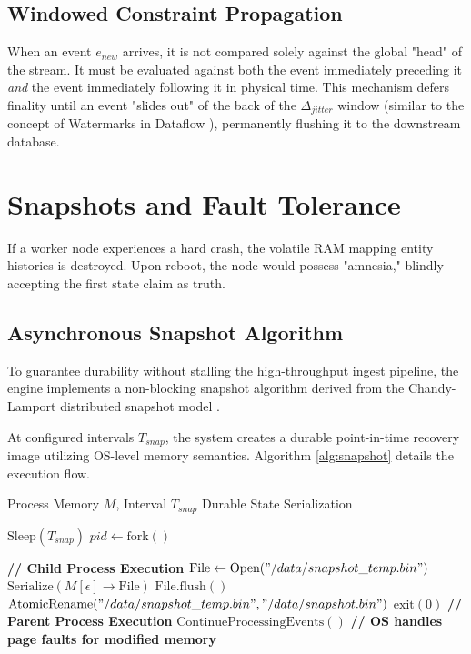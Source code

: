 \documentclass[conference]{IEEEtran}
\begin{document}
\subsection{Windowed Constraint Propagation}
When an event $e_{new}$ arrives, it is not compared solely against the global "head" of the stream. It must be evaluated against both the event immediately preceding it \textit{and} the event immediately following it in physical time. This mechanism defers finality until an event "slides out" of the back of the $\Delta_{jitter}$ window (similar to the concept of Watermarks in Dataflow \cite{b17}), permanently flushing it to the downstream database.

\section{Snapshots and Fault Tolerance}

If a worker node experiences a hard crash, the volatile RAM mapping entity histories is destroyed. Upon reboot, the node would possess "amnesia," blindly accepting the first state claim as truth.

\subsection{Asynchronous Snapshot Algorithm}
To guarantee durability without stalling the high-throughput ingest pipeline, the engine implements a non-blocking snapshot algorithm derived from the Chandy-Lamport distributed snapshot model \cite{b4}.

At configured intervals $T_{snap}$, the system creates a durable point-in-time recovery image utilizing OS-level memory semantics. Algorithm \ref{alg:snapshot} details the execution flow.

\begin{algorithm}[h]
\caption{Asynchronous State Snapshot via Fork}
\begin{algorithmic}[1]
\REQUIRE Process Memory $M$, Interval $T_{snap}$
\ENSURE Durable State Serialization

    \STATE $\text{Sleep}(T_{snap})$
    \STATE $pid \leftarrow \text{fork}()$ 
    
        \STATE \textbf{// Child Process Execution}
        \STATE $\text{File} \leftarrow \text{Open}("/data/snapshot\_temp.bin")$
            \STATE $\text{Serialize}(M[\epsilon] \to \text{File})$
        \ENDFOR
        \STATE $\text{File.flush}()$
        \STATE $\text{AtomicRename}("/data/snapshot\_temp.bin", "/data/snapshot.bin")$
        \STATE $\text{exit}(0)$ 
    \ELSE
        \STATE \textbf{// Parent Process Execution}
        \STATE $\text{ContinueProcessingEvents}()$ 
        \STATE \textbf{// OS handles page faults for modified memory}
    \ENDIF
\ENDWHILE
\end{algorithmic}
\label{alg:snapshot}
\end{algorithm}
\end{document}
